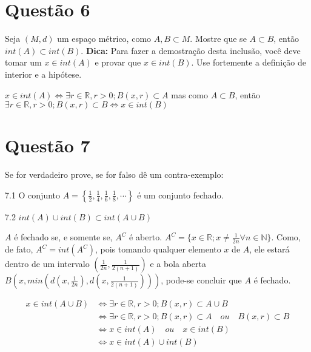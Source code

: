 \documentclass[10pt,a4paper]{article}
\begin{document}
	\section*{Questão 6}
	
	Seja $ (M, d) $ um espaço métrico, como $ A, B \subset M $. Mostre que se $ A \subset B $, então $ int(A) \subset int(B) $. \textbf{Dica:} Para fazer a demostração desta inclusão, você deve tomar um $ x \in int(A)$ e provar que $ x \in int(B) $. Use fortemente a definição de interior e a hipótese.
	
	$ x \in int(A) \Leftrightarrow \exists r \in \mathbb{R},  r > 0; B(x, r) \subset A $ mas como $ A \subset B $, então $ \exists r \in \mathbb{R},  r > 0; B(x, r) \subset B \Leftrightarrow x \in int(B) $
	
	\section*{Questão 7}
	
	Se for verdadeiro prove, se for falso dê um contra-exemplo:
	
	7.1 O conjunto $A = \left\{ \frac{1}{2}, \frac{1}{4}, \frac{1}{6}, \frac{1}{8}, \cdots \right\}$ é um conjunto fechado.
	
	7.2 $ int(A) \cup int(B) \subset int(A \cup B) $
	
	$A$ é fechado se, e somente se, $A^C$ é aberto. $A^C = \{x \in \mathbb{R}; x \neq \frac{1}{2n} \forall n \in \mathbb{N} \}$. Como, de fato, $A^C = int(A^C)$, pois tomando qualquer elemento $x$ de $A$, ele estará dentro de um intervalo $ \left( \frac{1}{2n}, \frac{1}{2(n+1)} \right) $ e a bola aberta $ B\left( x, min \left( d\left( x, \frac{1}{2n} \right), d\left( x, \frac{1}{2(n+1)} \right) \right) \right) $, pode-se concluir que $ A $ é fechado.
	
	\begin{equation}
		\begin{aligned}
		x \in int(A \cup B) &\Leftrightarrow \exists r \in \mathbb{R}, r > 0; B(x, r) \subset A \cup B\\
		&\Leftrightarrow
		\exists r \in \mathbb{R}, r > 0; B(x, r) \subset A \quad ou \quad B(x, r) \subset B\\
		&\Leftrightarrow x \in int(A) \quad ou \quad x \in int(B) \\
		&\Leftrightarrow x \in int(A) \cup int(B)
		\end{aligned}
	\end{equation}
	
	
\end{document}
